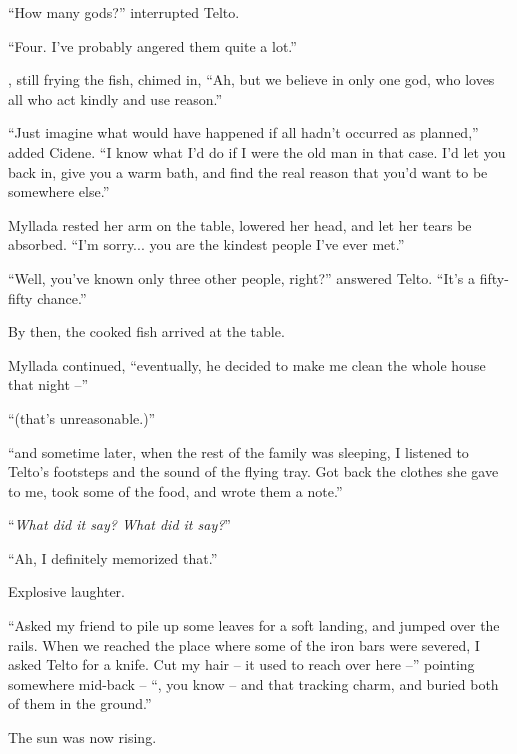 ``How many gods?'' interrupted Telto.

``Four. I've probably angered them quite a lot.''

\sypros, still frying the fish, chimed in, ``Ah, but we believe in only one god, who loves all who act kindly and use reason.''

``Just imagine what would have happened if all hadn't occurred as planned,'' added Cidene. ``I know what I'd do if I were the old man in that case. I'd let you back in, give you a warm bath, and find the real reason that you'd want to be somewhere else.''

Myllada rested her arm on the table, lowered her head, and let her tears be absorbed. ``I'm sorry... you are the kindest people I've ever met.''

``Well, you've known only three other people, right?'' answered Telto. ``It's a fifty-fifty chance.''

By then, the cooked fish arrived at the table.

Myllada continued, ``eventually, he decided to make me clean the whole house that night --''

``(that's unreasonable.)''

``and sometime later, when the rest of the family was sleeping, I listened to Telto's footsteps and the sound of the flying tray. Got back the clothes she gave to me, took some of the food, and wrote them a note.''

``\emph{What did it say? What did it say?}''

``Ah, I definitely memorized that.''


Explosive laughter.

``Asked my friend to pile up some leaves for a soft landing, and jumped over the rails. When we reached the place where some of the iron bars were severed, I asked Telto for a knife. Cut my hair -- it used to reach over here --'' pointing somewhere mid-back -- ``, you know -- and that tracking charm, and buried both of them in the ground.''

\centeredstars

The sun was now rising.


